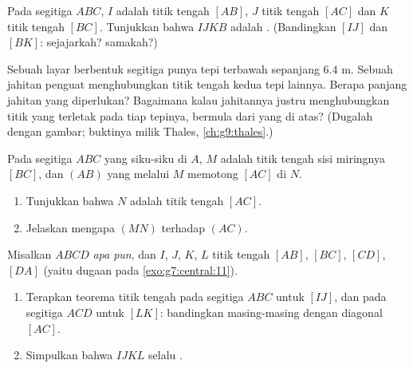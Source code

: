 \begin{exercise}[$\star\star$]\label{exo:g8:midpoints:6}
Pada segitiga $ABC$, $I$ adalah titik tengah $[AB]$, $J$ titik tengah
$[AC]$ dan $K$ titik tengah $[BC]$. Tunjukkan bahwa $IJKB$ adalah
. (Bandingkan $[IJ]$ dan $[BK]$: sejajarkah? samakah?)
\end{exercise}

\begin{exercise}[$\star\star$]\label{exo:g8:midpoints:7}
Sebuah layar berbentuk segitiga punya tepi terbawah sepanjang $6.4$ m.
Sebuah jahitan penguat menghubungkan titik tengah kedua tepi lainnya.
Berapa panjang jahitan yang diperlukan? Bagaimana kalau jahitannya
justru menghubungkan titik yang terletak pada  tiap tepinya,
bermula dari  yang di atas? (Dugalah dengan gambar;
buktinya milik Thales, \cref{ch:g9:thales}.)
\end{exercise}

\begin{exercise}[$\star\star$]\label{exo:g8:midpoints:8}
Pada segitiga $ABC$ yang siku-siku di $A$, $M$ adalah titik tengah
sisi miringnya $[BC]$, dan  $(AB)$ yang melalui $M$
memotong $[AC]$ di $N$.
\begin{enumerate}
  \item Tunjukkan bahwa $N$ adalah titik tengah $[AC]$.
  \item Jelaskan mengapa $(MN)$  terhadap $(AC)$.
\end{enumerate}
\end{exercise}

\begin{exercise}[$\star\star\star$]\label{exo:g8:midpoints:9}
Misalkan $ABCD$  \emph{apa pun}, dan $I$, $J$, $K$, $L$
titik tengah $[AB]$, $[BC]$, $[CD]$, $[DA]$ (yaitu dugaan pada
\cref{exo:g7:central:11}).
\begin{enumerate}
  \item Terapkan teorema titik tengah pada segitiga $ABC$ untuk  $[IJ]$, dan pada segitiga $ACD$ untuk 
        $[LK]$: bandingkan masing-masing dengan diagonal $[AC]$.
  \item Simpulkan bahwa $IJKL$ selalu .
\end{enumerate}
\end{exercise}

